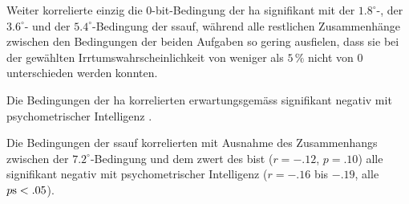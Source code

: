 \documentclass[11pt, twoside, a4paper]{book}		%
\begin{document}
Weiter korrelierte einzig die 0-bit-Bedingung der \gls{ha} signifikant mit der $1.8^{\circ}$-, der $3.6^{\circ}$- und der $5.4^{\circ}$-Bedingung der \gls{ssauf}, während alle restlichen Zusammenhänge zwischen den Bedingungen der beiden Aufgaben so gering ausfielen, dass sie bei der gewählten Irrtumswahrscheinlichkeit von weniger als $5\,\%$ nicht von 0 unterschieden werden konnten.

Die Bedingungen der \gls{ha} korrelierten erwartungsgemäss signifikant negativ mit psychometrischer Intelligenz \citep[$r=-.19$ bis $-.28$, alle $p\textnormal{s}<.05$; vgl. ][]{Sheppard2008}.

Die Bedingungen der \gls{ssauf} korrelierten mit Ausnahme des Zusammenhangs zwischen der $7.2^{\circ}$-Bedingung und dem \gls{zwert} des \gls{bist} ($r=-.12$, $p=.10$) alle signifikant negativ mit psychometrischer Intelligenz ($r=-.16$ bis $-.19$, alle $p\textnormal{s}<.05$).
\end{document}
